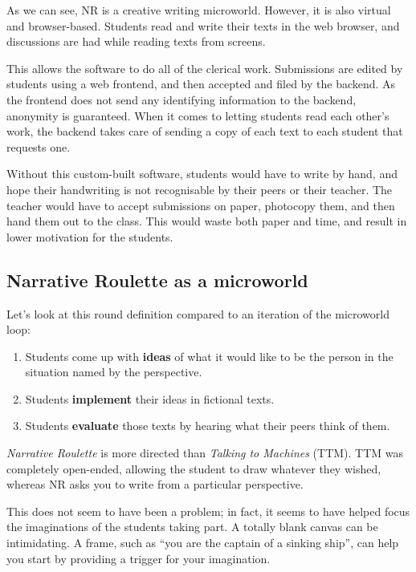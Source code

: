 As we can see, NR is a creative writing microworld. However, it is also
virtual and browser-based. Students read and write their texts in the
web browser, and discussions are had while reading texts from screens.

This allows the software to do all of the clerical work. Submissions are
edited by students using a web frontend, and then accepted and filed by
the backend. As the frontend does not send any identifying information
to the backend, anonymity is guaranteed. When it comes to letting
students read each other's work, the backend takes care of sending a
copy of each text to each student that requests one.

Without this custom-built software, students would have to write by
hand, and hope their handwriting is not recognisable by their peers or
their teacher. The teacher would have to accept submissions on paper,
photocopy them, and then hand them out to the class. This would waste
both paper and time, and result in lower motivation for the students.

\subsection{Narrative Roulette as a microworld}

Let's look at this round definition compared to an iteration of the
microworld loop: 

\begin{enumerate}
\item Students come up with \textbf{ideas} of what it would like to be the person in the situation named by the perspective.
\item Students \textbf{implement} their ideas in fictional texts. 
\item Students \textbf{evaluate} those texts by hearing what their peers think
of them.
\end{enumerate}

\emph{Narrative Roulette} is more directed than \emph{Talking to
Machines} (TTM). TTM was completely open-ended, allowing the student to
draw whatever they wished, whereas NR asks you to write from a
particular perspective.

This does not seem to have been a problem; in fact, it seems to have
helped focus the imaginations of the students taking part. A totally
blank canvas can be intimidating. A frame, such as ``you are the captain
of a sinking ship'', can help you start by providing a trigger for your imagination.

